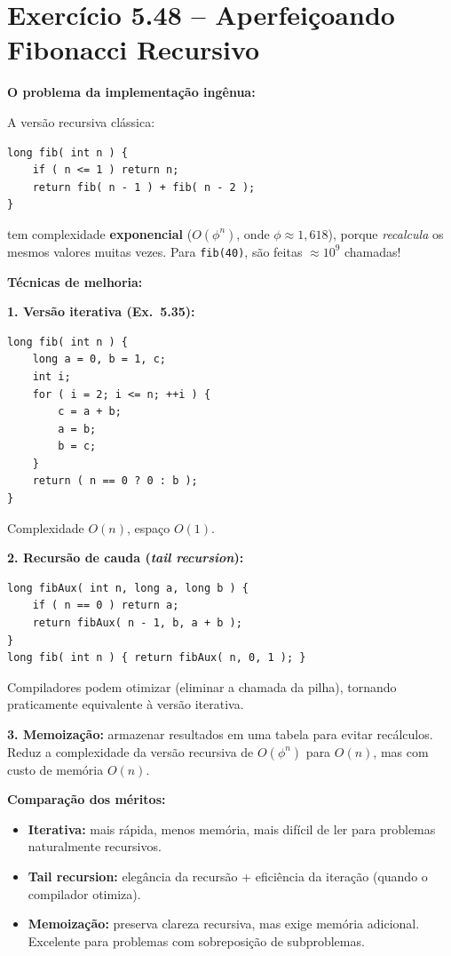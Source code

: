 \documentclass[12pt,a4paper]{article}
\begin{document}
\newpage

\section{Exercício 5.48 -- Aperfeiçoando Fibonacci Recursivo}

\begin{respostabox}
\textbf{O problema da implementação ingênua:}

A versão recursiva clássica:
\begin{lstlisting}
long fib( int n ) {
    if ( n <= 1 ) return n;
    return fib( n - 1 ) + fib( n - 2 );
}
\end{lstlisting}
tem complexidade \textbf{exponencial} ($O(\phi^n)$, onde $\phi \approx 1{,}618$),
porque \textit{recalcula} os mesmos valores muitas vezes. Para \texttt{fib(40)},
são feitas \(\approx 10^9\) chamadas!

\textbf{Técnicas de melhoria:}

\textbf{1. Versão iterativa (Ex.~5.35):}
\begin{lstlisting}
long fib( int n ) {
    long a = 0, b = 1, c;
    int i;
    for ( i = 2; i <= n; ++i ) {
        c = a + b;
        a = b;
        b = c;
    }
    return ( n == 0 ? 0 : b );
}
\end{lstlisting}
Complexidade $O(n)$, espaço $O(1)$.

\textbf{2. Recursão de cauda (\textit{tail recursion}):}
\begin{lstlisting}
long fibAux( int n, long a, long b ) {
    if ( n == 0 ) return a;
    return fibAux( n - 1, b, a + b );
}
long fib( int n ) { return fibAux( n, 0, 1 ); }
\end{lstlisting}
Compiladores podem otimizar (eliminar a chamada da pilha), tornando praticamente
equivalente à versão iterativa.

\textbf{3. Memoização:} armazenar resultados em uma tabela para evitar recálculos.
Reduz a complexidade da versão recursiva de $O(\phi^n)$ para $O(n)$, mas com custo
de memória $O(n)$.

\textbf{Comparação dos méritos:}
\begin{itemize}[noitemsep]
  \item \textbf{Iterativa:} mais rápida, menos memória, mais difícil de ler para
  problemas naturalmente recursivos.
  \item \textbf{Tail recursion:} elegância da recursão + eficiência da iteração
  (quando o compilador otimiza).
  \item \textbf{Memoização:} preserva clareza recursiva, mas exige memória
  adicional. Excelente para problemas com sobreposição de subproblemas.
\end{itemize}
\end{respostabox}
\end{document}
